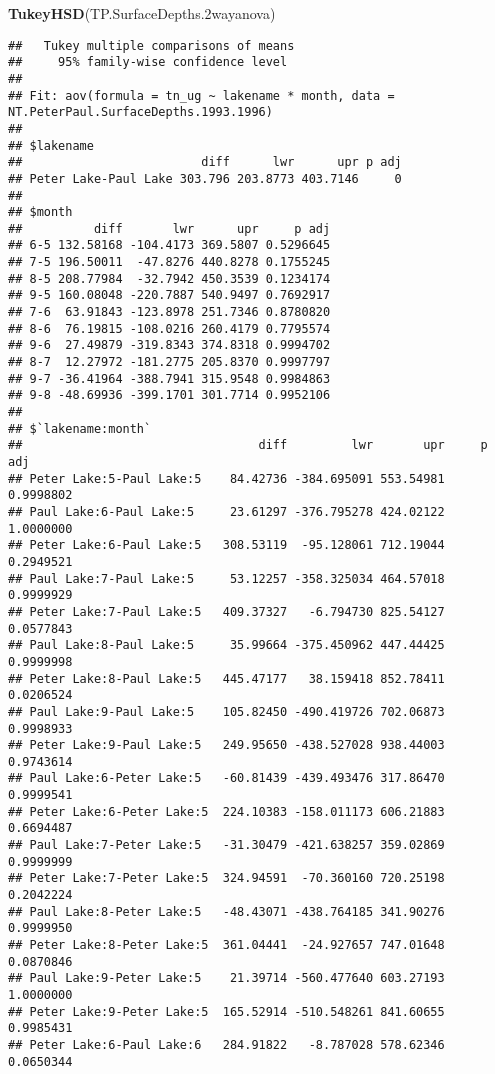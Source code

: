 \documentclass[]{article}
\newenvironment{Shaded}{\begin{snugshade}}{\end{snugshade}}
\newcommand{\FloatTok}[1]{\textcolor[rgb]{0.00,0.00,0.81}{#1}}
\newcommand{\KeywordTok}[1]{\textcolor[rgb]{0.13,0.29,0.53}{\textbf{#1}}}
\newcommand{\NormalTok}[1]{#1}
\begin{document}
\begin{Shaded}
\begin{Highlighting}[]
\KeywordTok{TukeyHSD}\NormalTok{(TP.SurfaceDepths}\FloatTok{.2}\NormalTok{wayanova)}
\end{Highlighting}
\end{Shaded}

\begin{verbatim}
##   Tukey multiple comparisons of means
##     95% family-wise confidence level
## 
## Fit: aov(formula = tn_ug ~ lakename * month, data = NT.PeterPaul.SurfaceDepths.1993.1996)
## 
## $lakename
##                         diff      lwr      upr p adj
## Peter Lake-Paul Lake 303.796 203.8773 403.7146     0
## 
## $month
##          diff       lwr      upr     p adj
## 6-5 132.58168 -104.4173 369.5807 0.5296645
## 7-5 196.50011  -47.8276 440.8278 0.1755245
## 8-5 208.77984  -32.7942 450.3539 0.1234174
## 9-5 160.08048 -220.7887 540.9497 0.7692917
## 7-6  63.91843 -123.8978 251.7346 0.8780820
## 8-6  76.19815 -108.0216 260.4179 0.7795574
## 9-6  27.49879 -319.8343 374.8318 0.9994702
## 8-7  12.27972 -181.2775 205.8370 0.9997797
## 9-7 -36.41964 -388.7941 315.9548 0.9984863
## 9-8 -48.69936 -399.1701 301.7714 0.9952106
## 
## $`lakename:month`
##                                 diff         lwr       upr     p adj
## Peter Lake:5-Paul Lake:5    84.42736 -384.695091 553.54981 0.9998802
## Paul Lake:6-Paul Lake:5     23.61297 -376.795278 424.02122 1.0000000
## Peter Lake:6-Paul Lake:5   308.53119  -95.128061 712.19044 0.2949521
## Paul Lake:7-Paul Lake:5     53.12257 -358.325034 464.57018 0.9999929
## Peter Lake:7-Paul Lake:5   409.37327   -6.794730 825.54127 0.0577843
## Paul Lake:8-Paul Lake:5     35.99664 -375.450962 447.44425 0.9999998
## Peter Lake:8-Paul Lake:5   445.47177   38.159418 852.78411 0.0206524
## Paul Lake:9-Paul Lake:5    105.82450 -490.419726 702.06873 0.9998933
## Peter Lake:9-Paul Lake:5   249.95650 -438.527028 938.44003 0.9743614
## Paul Lake:6-Peter Lake:5   -60.81439 -439.493476 317.86470 0.9999541
## Peter Lake:6-Peter Lake:5  224.10383 -158.011173 606.21883 0.6694487
## Paul Lake:7-Peter Lake:5   -31.30479 -421.638257 359.02869 0.9999999
## Peter Lake:7-Peter Lake:5  324.94591  -70.360160 720.25198 0.2042224
## Paul Lake:8-Peter Lake:5   -48.43071 -438.764185 341.90276 0.9999950
## Peter Lake:8-Peter Lake:5  361.04441  -24.927657 747.01648 0.0870846
## Paul Lake:9-Peter Lake:5    21.39714 -560.477640 603.27193 1.0000000
## Peter Lake:9-Peter Lake:5  165.52914 -510.548261 841.60655 0.9985431
## Peter Lake:6-Paul Lake:6   284.91822   -8.787028 578.62346 0.0650344

\end{verbatim}
\end{document}
